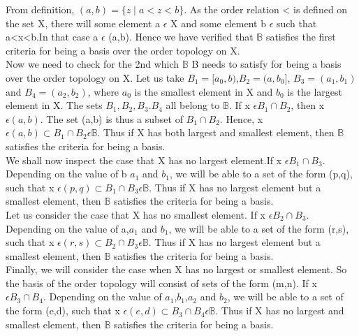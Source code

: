 \documentclass[a4paper,english,12pt]{article}
\begin{document}
\begin{flushleft}
\vspace{1mm}
From definition, $(a,b)=\{z\mid a<z<b\}$. As the order relation < is defined on the set X, there will some element a $\epsilon$ X and some element b $\epsilon$ such that a<x<b.In that case a $\epsilon$ (a,b). Hence we have verified that $\mathbb{B}$ satisfies the first criteria for being a basis over the order topology on X.\\
Now we need to check for the 2nd  which $\mathbb{B}$ B needs to satisfy for being a basis over the order topology on X. Let us take $B_1=[a_0,b)$,$B_2=(a,b_0]$, $B_3=(a_1,b_1)$ and $B_4=(a_2,b_2)$, where $a_0$ is the smallest element in X and $b_0$ is the largest element in X. The sets $B_1,B_2,B_3.B_4$ all belong to $\mathbb{B}$.
If x $\epsilon B_1 \cap B_2$, then x $\epsilon (a,b)$. The set (a,b) is thus a subset of $B_1 \cap B_2$. Hence, x $\epsilon (a,b) \subset B_1 \cap B_2 \epsilon \mathbb{B}$. Thus if X has both largest and smallest element, then $\mathbb{B}$ satisfies the criteria for being a basis.\\
\vspace{1mm}
We shall now inspect the case that X has no largest element.If x $\epsilon B_1 \cap B_3$. Depending on the value of b  $a_1$ and $b_1$, we will be able to a set of the form (p,q), such that  x $\epsilon (p,q) \subset B_1 \cap B_3 \epsilon \mathbb{B}$. Thus if X has no largest element but a smallest element, then $\mathbb{B}$ satisfies the criteria for being a basis.\\
\vspace{1mm}
Let us consider the case that X has no smallest element. If x $\epsilon B_2 \cap B_3$. Depending on the value of a,$a_1$ and $b_1$, we will be able to a set of the form (r,s), such that  x $\epsilon (r,s) \subset B_2 \cap B_3 \epsilon \mathbb{B}$. Thus if X has no largest element but a smallest element, then $\mathbb{B}$ satisfies the criteria for being a basis.\\
\vspace{1mm}
Finally, we will consider the case when X has no largest or smallest element. So the basis of the order topology will consist of sets of the form (m,n). If x $\epsilon B_3 \cap B_4$. Depending on the value of $a_1$,$b_1$,$a_2$ and $b_2$, we will be able to a set of the form (e,d), such that  x $\epsilon (e,d) \subset B_3 \cap B_4 \epsilon \mathbb{B}$. Thus if X has no largest and smallest element, then $\mathbb{B}$ satisfies the criteria for being a basis.\\
\vspace{1mm}

\end{flushleft}
\end{document}
